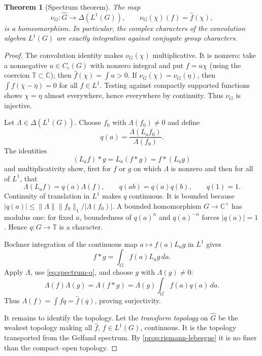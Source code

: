 \documentclass[11pt]{article}
\newtheorem{theorem}{Theorem}[section]
\theoremstyle{definition}
\theoremstyle{remark}
\newcommand{\T}{\mathbb T}
\newcommand{\C}{\mathbb C}
\newcommand{\Cc}{C_{\mathrm c}}
\newcommand{\Lp}[1]{L^{#1}}
\newcommand{\dual}[1]{\widehat{#1}}
\newcommand{\abs}[1]{\lvert #1\rvert}
\newcommand{\norm}[1]{\lVert #1\rVert}
\begin{document}
\begin{theorem}[Spectrum theorem]
\label{thm:l1-spectrum}
The map
\[
 \nu_G:\dual G\longrightarrow\Delta(\Lp1(G)),\qquad
 \nu_G(\chi)(f)=\widehat f(\chi),
\]
is a homeomorphism.  In particular, the complex characters of the convolution algebra
$\Lp1(G)$ are exactly integration against conjugate group characters.
\end{theorem}

\begin{proof}
The convolution identity makes $\nu_G(\chi)$ multiplicative.  It is nonzero: take a
nonnegative $u\in\Cc(G)$ with nonzero integral and put $f=u\chi$ (using the coercion
$\T\subset\C$); then $\widehat f(\chi)=\int u>0$.  If
$\nu_G(\chi)=\nu_G(\eta)$, then
$\int f(\overline\chi-\overline\eta)=0$ for all $f\in\Lp1$.  Testing against compactly
supported functions shows $\chi=\eta$ almost everywhere, hence everywhere by
continuity.  Thus $\nu_G$ is injective.

Let $\Lambda\in\Delta(\Lp1(G))$.  Choose $f_0$ with $\Lambda(f_0)\neq0$ and define
\[
 q(a)=\frac{\Lambda(L_af_0)}{\Lambda(f_0)}.
\]
The identities
\[
 (L_af)*g=L_a(f*g)=f*(L_ag)
\]
and multiplicativity show, first for $f$ or $g$ on which $\Lambda$ is nonzero and then
for all of $\Lp1$, that
\begin{equation}
  \Lambda(L_af)=q(a)\Lambda(f),\qquad q(ab)=q(a)q(b),\qquad q(1)=1.
  \label{eq:spectrum-q}
\end{equation}
Continuity of translation in $\Lp1$ makes $q$ continuous.  It is bounded because
$\abs{q(a)}\leq\norm\Lambda\norm{f_0}_1/\abs{\Lambda(f_0)}$.  A bounded homomorphism
$G\to\C^\times$ has modulus one: for fixed $a$, boundedness of $q(a)^n$ and
$q(a)^{-n}$ forces $\abs{q(a)}=1$.  Hence $q:G\to\T$ is a character.

Bochner integration of the continuous map $a\mapsto f(a)L_ag$ in $\Lp1$ gives
\[
 f*g=\int_G f(a)L_ag\,da.
\]
Apply $\Lambda$, use \eqref{eq:spectrum-q}, and choose $g$ with
$\Lambda(g)\neq0$:
\[
 \Lambda(f)\Lambda(g)=\Lambda(f*g)
 =\Lambda(g)\int_Gf(a)q(a)\,da.
\]
Thus $\Lambda(f)=\int f q=\widehat f(\overline q)$, proving surjectivity.

It remains to identify the topology.  Let the \emph{transform topology} on $\dual G$ be
the weakest topology making all $\widehat f$, $f\in\Lp1(G)$, continuous.  It is the
topology transported from the Gelfand spectrum.  By
\cref{prop:riemann-lebesgue} it is no finer than the compact--open topology.


\end{proof}
\end{document}
